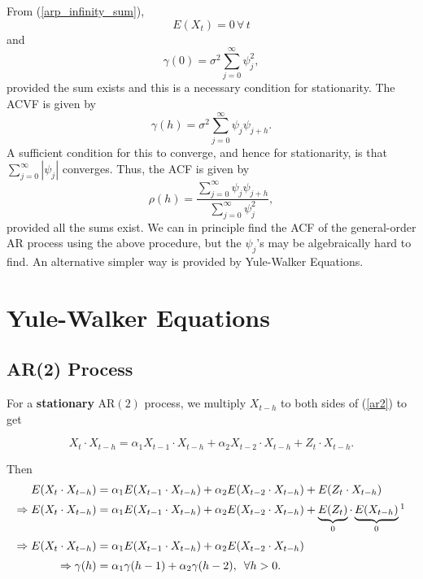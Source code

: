 \documentclass[11pt, a4paper]{article}
\numberwithin{equation}{section}
\theoremstyle{definition}
\begin{document}
From (\ref{arp_infinity_sum}), $$E(X_t) = 0 \, \forall \, t$$ and 
$$\gamma(0) = \sigma^2 \sum \limits_{j=0}^{\infty} \psi_j^2,$$ provided the sum exists and this is a necessary condition for stationarity. The ACVF is given by
$$\gamma(h) = \sigma^2 \sum \limits_{j=0}^{\infty} \psi_j \psi_{j+h}.$$
A sufficient condition for this to converge, and hence for stationarity, is that $\sum \limits_{j=0}^{\infty} |\psi_j|$ converges. Thus, the ACF is given by
$$\rho(h) = \dfrac{\sum \limits_{j=0}^{\infty} \psi_j \psi_{j+h}}
{\sum \limits_{j=0}^{\infty} \psi_j^2},$$
provided all the sums exist. We can in principle find the ACF of the general-order AR process using the above procedure, but the $\psi_j$'s may be algebraically hard to find. An alternative simpler way is provided by Yule-Walker Equations.

\newpage

\section{Yule-Walker Equations}

\subsection{AR(2) Process}

For a \textbf{stationary} AR$(2)$ process, we multiply $X_{t-h}$ to both sides of (\ref{ar2}) to get

$$X_t \cdot X_{t-h} = \alpha_1 X_{t-1} \cdot X_{t-h} + \alpha_2 X_{t-2} \cdot X_{t-h} + Z_t \cdot X_{t-h}.$$

Then
\begin{align}
E(X_t \cdot X_{t-h}) &= \alpha_1 E(X_{t-1} \cdot X_{t-h}) + \alpha_2 E(X_{t-2} \cdot X_{t-h}) + E(Z_t \cdot X_{t-h}) \nonumber \\[0.25em]
\Rightarrow E(X_t \cdot X_{t-h}) &= \alpha_1 E(X_{t-1} \cdot X_{t-h}) + \alpha_2 E(X_{t-2} \cdot X_{t-h}) + \underbrace{E(Z_t)}_{0} \cdot \underbrace{E(X_{t-h})}_{0} \footnotemark \nonumber \\[0.25em]
\Rightarrow E(X_t \cdot X_{t-h}) &= \alpha_1 E(X_{t-1} \cdot X_{t-h}) + \alpha_2 E(X_{t-2} \cdot X_{t-h}) \nonumber \\[0.25em]
\Rightarrow \gamma(h) &= \alpha_1 \gamma(h-1) + \alpha_2 \gamma(h-2), \,\,\, \forall h > 0.
\end{align}
\end{document}
